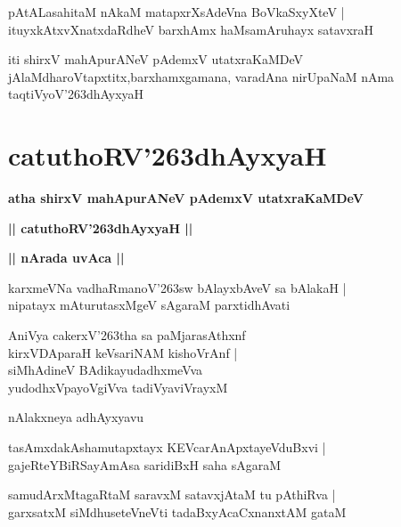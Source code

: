 \documentclass[twoside,12pt,openright]{book}
\def\S{\char'263}
\newcounter{shloka}[chapter]
\def\uvaca#1{\centerline{{\large\textbf{#1}}}}
\begin{document}
\begin{shloka}%
pAtALasahitaM nAkaM matapxrXsAdeVna BoVkaSxyXteV |\\
ituyxkAtxvXnatxdaRdheV barxhAmx haMsamAruhayx satavxraH 
\end{shloka}

\begin{center}
iti shirxV mahApurANeV pAdemxV utatxraKaMDeV jAlaMdharoVtapxtitx,barxhamxgamana, varadAna nirUpaNaM nAma  
taqtiVyoV\S dhAyxyaH 
\end{center}

\chapter{catuthoRV\S dhAyxyaH}

\begin{center}
{\LARGE\bfseries atha shirxV mahApurANeV pAdemxV utatxraKaMDeV} 
\end{center}

\begin{center}
{\LARGE\bfseries  || catuthoRV\S dhAyxyaH ||}
\end{center}

\uvaca{|| nArada uvAca ||}

\begin{shloka}%
karxmeVNa vadhaRmanoV\S sw bAlayxbAveV sa bAlakaH |\\
nipatayx mAturutasxMgeV sAgaraM parxtidhAvati
\end{shloka}

\begin{shloka}%
AniVya cakerxV\S tha sa paMjarasAthxnf \\
kirxVDAparaH keVsariNAM kishoVrAnf |\\
siMhAdineV BAdikayudadhxmeVva \\
yudodhxVpayoVgiVva tadiVyaviVrayxM 
\end{shloka}

\begin{center}
nAlakxneya adhAyxyavu
\end{center}

\begin{shloka}%
tasAmxdakAshamutapxtayx KEVcarAnApxtayeVduBxvi |\\
gajeRteYBiRSayAmAsa saridiBxH saha sAgaraM 
\end{shloka}

\begin{shloka}%
samudArxMtagaRtaM saravxM satavxjAtaM tu pAthiRva |\\
garxsatxM siMdhuseteVneVti tadaBxyAcaCxnanxtAM gataM 
\end{shloka}
\end{document}
